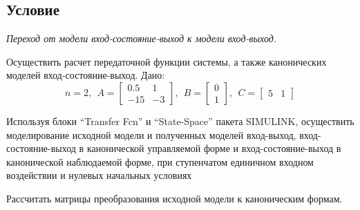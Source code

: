 \documentclass[a4paper, 12pt]{article}
\begin{document}
    \subsection{Условие}
    \textit{Переход от модели вход-состояние-выход к модели вход-выход.}
    \begin{compactitem}
    \item Осуществить расчет передаточной функции системы, а также канонических моделей вход-состояние-выход. Дано:
    $$n=2,\ \ A=
    \begin{bmatrix}
        0.5 & 1\\
        -15 & -3
    \end{bmatrix},\ \
    B=
    \begin{bmatrix}
        0\\
        1
    \end{bmatrix},\ \
    C=
    \begin{bmatrix}
        5 & 1
    \end{bmatrix}$$
    \item Используя блоки ``Transfer Fcn'' и ``State-Space'' пакета SIMULINK,
    осуществить моделирование исходной модели и полученных моделей вход-выход,
    вход-состояние-выход в канонической управляемой форме и вход-состояние-выход
    в канонической наблюдаемой форме, при ступенчатом единичном входном воздействии
    и нулевых начальных условиях
    \item Рассчитать матрицы преобразования исходной модели к каноническим формам.
    \end{compactitem}
\end{document}
